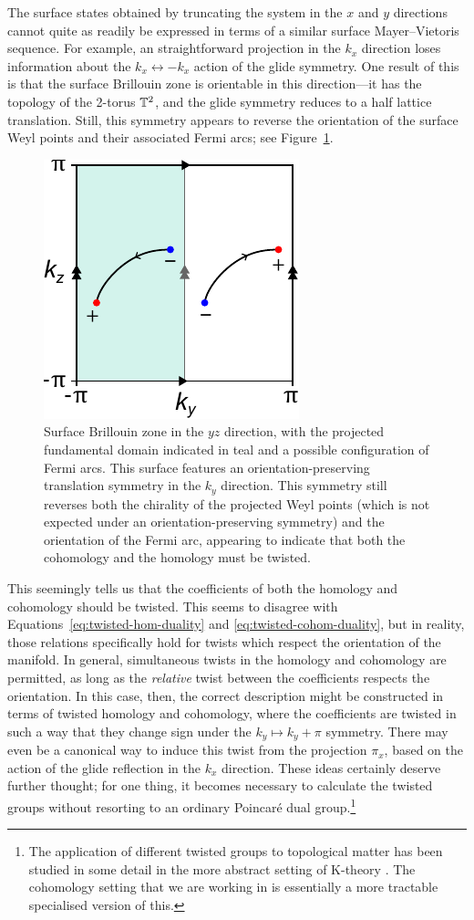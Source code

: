 The surface states obtained by truncating the system in the $x$ and $y$ directions cannot quite as readily be expressed in terms of a similar surface Mayer--Vietoris sequence. For example, an straightforward projection in the $k_x$ direction loses information about the $k_x\leftrightarrow-k_x$ action of the glide symmetry. One result of this is that the surface Brillouin zone is orientable in this direction---it has the topology of the 2-torus $\mathbb{T}^2$, and the glide symmetry reduces to a half lattice translation. Still, this symmetry appears to reverse the orientation of the surface Weyl points and their associated Fermi arcs; see Figure~\ref{fig:BZ_yz-surface}.
\begin{figure}[htb!]
	\centering
	\includegraphics[width=.45\linewidth]{Images/BZ_yz-surface}
	\caption{Surface Brillouin zone in the $yz$ direction, with the projected fundamental domain indicated in teal and a possible configuration of Fermi arcs. This surface features an orientation-preserving translation symmetry in the $k_y$ direction. This symmetry still reverses both the chirality of the projected Weyl points (which is not expected under an orientation-preserving symmetry) and the orientation of the Fermi arc, appearing to indicate that both the cohomology and the homology must be twisted.}
	\label{fig:BZ_yz-surface}
\end{figure}
This seemingly tells us that the coefficients of both the homology and cohomology should be twisted. This seems to disagree with Equations~\eqref{eq:twisted-hom-duality} and \eqref{eq:twisted-cohom-duality}, but in reality, those relations specifically hold for twists which respect the orientation of the manifold. In general, simultaneous twists in the homology and cohomology are permitted, as long as the \emph{relative} twist between the coefficients respects the orientation. In this case, then, the correct description might be constructed in terms of twisted homology and cohomology, where the coefficients are twisted in such a way that they change sign under the $k_y\mapsto k_y+\pi$ symmetry. There may even be a canonical way to induce this twist from the projection $\pi_x$, based on the action of the glide reflection in the $k_x$ direction. These ideas certainly deserve further thought; for one thing, it becomes necessary to calculate the twisted groups without resorting to an ordinary Poincaré dual group.\footnote{
	The application of different twisted groups to topological matter has been studied in some detail in the more abstract setting of K-theory \cite{FreedMoore_K-theory,Thiang_K-theory}. The cohomology setting that we are working in is essentially a more tractable specialised version of this.}

